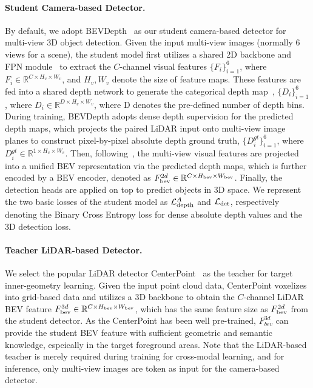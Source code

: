 \paragraph{Student Camera-based Detector.}
By default, we adopt BEVDepth~\cite{b7} as our student camera-based detector for multi-view 3D object detection. 
Given the input multi-view images (normally 6 views for a scene), the student model first utilizes a shared 2D backbone and FPN module~\cite{b54} to extract the $C$-channel visual features $\{F_i\}_{i=1}^6$, where $F_i \in {\mathbb{R}^{C\times H_v\times W_v}}$, and $H_v, W_v$ denote the size of feature maps. These features are fed into a shared depth network to generate the categorical depth map~\cite{b51}, $\{D_i\}_{i=1}^6$, where ${D_i}\in {\mathbb{R}^{D\times H_v\times W_v}}$, where D denotes the pre-defined number of depth bins. During training, BEVDepth adopts dense depth supervision for the predicted depth maps, which projects the paired LiDAR input onto multi-view image planes to construct pixel-by-pixel absolute depth ground truth, $\{D_i^{gt}\}_{i=1}^6$, where ${D_i^{gt}}\in {\mathbb{R}^{1\times H_v\times W_v}}$. 
Then, following~\cite{b20}, the multi-view visual features are projected into a unified BEV representation via the predicted depth maps, which is further encoded by a BEV encoder, denoted as $F^{2d}_{\rm bev}\in {\mathbb{R}^{C\times H_{\rm bev}\times W_{\rm bev}}}$. Finally, the detection heads are applied on top to predict objects in 3D space. We represent the two basic losses of the student model as $\mathcal{L}_{\rm{depth}}^{A}$ and $\mathcal{L}_{\rm{det}}$, respectively denoting the Binary Cross Entropy loss for dense absolute depth values and the 3D detection loss.

\paragraph{Teacher LiDAR-based Detector.}
We select the popular LiDAR detector CenterPoint~\cite{b53} as the teacher for target inner-geometry learning. Given the input point cloud data, CenterPoint voxelizes into grid-based data and utilizes a 3D backbone to obtain the $C$-channel LiDAR BEV feature $F^{3d}_{\rm bev}\in {\mathbb{R}^{C\times H_{\rm bev}\times W_{\rm bev}}}$, which has the same feature size as $F^{2d}_{\rm bev}$ from the student detector. As the CenterPoint has been well pre-trained, $F^{3d}_{bev}$ can provide the student BEV feature with sufficient geometric and semantic knowledge, espeically in the target foreground areas. Note that the LiDAR-based teacher is merely required during training for cross-modal learning, and for inference, only multi-view images are token as input for the camera-based detector.


